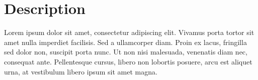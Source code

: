 \section*{Description}
\label{sec:description}

Lorem ipsum dolor sit amet, consectetur adipiscing elit. Vivamus porta tortor sit amet nulla imperdiet facilisis. Sed a ullamcorper diam. Proin ex lacus, fringilla sed dolor non, suscipit porta nunc. Ut non nisi malesuada, venenatis diam nec, consequat ante. Pellentesque cursus, libero non lobortis posuere, arcu est aliquet urna, at vestibulum libero ipsum sit amet magna.
